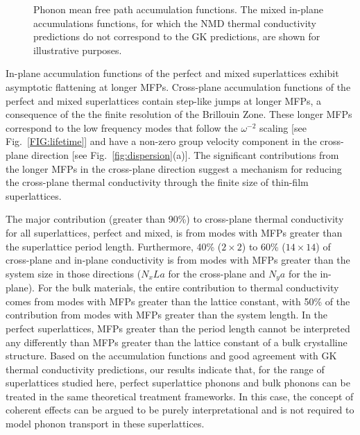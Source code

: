 \documentclass[aps,prb,preprint,preprintnumbers,amsmath,amssymb,floatfix,superscriptaddress]{revtex4}
\begin{document}
\begin{figure}%
\begin{center}
\renewcommand{\figure}{Fig.}
\caption{Phonon mean free path accumulation functions. The mixed in-plane accumulations functions, for which the NMD thermal conductivity predictions do not correspond to the GK predictions, are shown for illustrative purposes.}
\label{FIG:MFP_cuml}
\end{center}
\end{figure}
In-plane accumulation functions of the perfect and mixed superlattices exhibit asymptotic flattening at longer MFPs. Cross-plane accumulation functions of the perfect and mixed superlattices contain step-like jumps at longer MFPs, a consequence of the the finite resolution of the Brillouin Zone.\cite{esfarjani2011heat} These longer MFPs correspond to the low frequency modes that follow the $\omega^{-2}$ scaling [see Fig.~\ref{FIG:lifetime}] and have a non-zero group velocity component in the cross-plane direction [see Fig.~\ref{fig:dispersion}(a)]. The significant contributions from the longer MFPs in the cross-plane direction suggest a mechanism for reducing the cross-plane thermal conductivity through the finite size of thin-film superlattices.\cite{Luckyanova16112012} 

The major contribution (greater than 90\%) to cross-plane thermal conductivity for all superlattices, perfect and mixed, is from modes with MFPs greater than the superlattice period length. Furthermore, 40\% ($2 \times 2 $) to 60\% ($14 \times 14$) of cross-plane and in-plane conductivity is from modes with MFPs greater than the system size in those directions ($N_xLa$ for the cross-plane and $N_ya$ for the in-plane). For the bulk materials, the entire contribution to thermal conductivity comes from modes with MFPs greater than the lattice constant, with 50\% of the contribution from modes with MFPs greater than the system length. In the perfect superlattices, MFPs greater than the period length cannot be interpreted any differently than MFPs greater than the lattice constant of a bulk crystalline structure. Based on the accumulation functions and good agreement with GK thermal conductivity predictions, our results indicate that, for the range of superlattices studied here, perfect superlattice phonons and bulk phonons can be treated in the same theoretical treatment frameworks. In this case, the concept of coherent effects can be argued to be purely interpretational and is not required to model phonon transport in these superlattices. 
\end{document}
